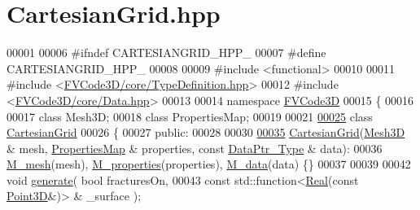 \hypertarget{CartesianGrid_8hpp_source}{}\section{Cartesian\+Grid.\+hpp}
\label{CartesianGrid_8hpp_source}

\begin{DoxyCode}
00001 
00006 \textcolor{preprocessor}{#ifndef CARTESIANGRID\_HPP\_}
00007 \textcolor{preprocessor}{#define CARTESIANGRID\_HPP\_}
00008 
00009 \textcolor{preprocessor}{#include <functional>}
00010 
00011 \textcolor{preprocessor}{#include <\hyperlink{TypeDefinition_8hpp}{FVCode3D/core/TypeDefinition.hpp}>}
00012 \textcolor{preprocessor}{#include <\hyperlink{Data_8hpp}{FVCode3D/core/Data.hpp}>}
00013 
00014 \textcolor{keyword}{namespace }\hyperlink{namespaceFVCode3D}{FVCode3D}
00015 \{
00016 
00017 \textcolor{keyword}{class }Mesh3D;
00018 \textcolor{keyword}{class }PropertiesMap;
00019 
00021 
\hypertarget{CartesianGrid_8hpp_source.tex_l00025}{}\hyperlink{classFVCode3D_1_1CartesianGrid}{00025} \textcolor{keyword}{class }\hyperlink{classFVCode3D_1_1CartesianGrid}{CartesianGrid}
00026 \{
00027 \textcolor{keyword}{public}:
00028 
00030 
\hypertarget{CartesianGrid_8hpp_source.tex_l00035}{}\hyperlink{classFVCode3D_1_1CartesianGrid_a0b6893665344152a46600ecfb4681b31}{00035}     \hyperlink{classFVCode3D_1_1CartesianGrid_a0b6893665344152a46600ecfb4681b31}{CartesianGrid}(\hyperlink{classFVCode3D_1_1Mesh3D}{Mesh3D} & mesh, \hyperlink{classFVCode3D_1_1PropertiesMap}{PropertiesMap} & properties, \textcolor{keyword}{const} 
      \hyperlink{namespaceFVCode3D_a3d19a370a98afe491a9e17a646a9c56f}{DataPtr\_Type} & data):
00036         \hyperlink{classFVCode3D_1_1CartesianGrid_a40c64e663b3d2de02b852403c75495fb}{M\_mesh}(mesh), \hyperlink{classFVCode3D_1_1CartesianGrid_a5d2cd7d64a7feeb775251173f14892af}{M\_properties}(properties), \hyperlink{classFVCode3D_1_1CartesianGrid_a8548798ae1d2a011869ed314a1ebb8f3}{M\_data}(data) \{\}
00037 
00039 
00042     \textcolor{keywordtype}{void} \hyperlink{classFVCode3D_1_1CartesianGrid_afdc4d12f34f9bf46db17ec8765e6875f}{generate}( \textcolor{keywordtype}{bool} fracturesOn,
00043                    \textcolor{keyword}{const} std::function<\hyperlink{namespaceFVCode3D_a40c1f5588a248569d80aa5f867080e83}{Real}(\textcolor{keyword}{const} \hyperlink{classFVCode3D_1_1Point3D}{Point3D}&)> & \_surface );

\end{DoxyCode}
